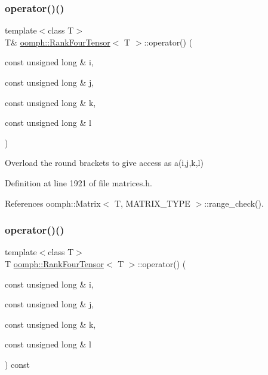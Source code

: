\mbox{\label{classoomph_1_1RankFourTensor_ab156bfb614c94c72d72452812d39897d}} 
\subsubsection{\texorpdfstring{operator()()}{operator()()}\hspace{0.1cm}{\footnotesize\ttfamily [1/2]}}
{\footnotesize\ttfamily template$<$class T$>$ \\
T\& \hyperlink{classoomph_1_1RankFourTensor}{oomph\+::\+Rank\+Four\+Tensor}$<$ T $>$\+::operator() (\begin{DoxyParamCaption}\item[{const unsigned long \&}]{i,  }\item[{const unsigned long \&}]{j,  }\item[{const unsigned long \&}]{k,  }\item[{const unsigned long \&}]{l }\end{DoxyParamCaption})\hspace{0.3cm}{\ttfamily [inline]}}



Overload the round brackets to give access as a(i,j,k,l) 



Definition at line 1921 of file matrices.\+h.



References oomph\+::\+Matrix$<$ T, M\+A\+T\+R\+I\+X\+\_\+\+T\+Y\+P\+E $>$\+::range\+\_\+check().

\mbox{\label{classoomph_1_1RankFourTensor_ab2319b2c0d1e48c6908b3a51c6105099}} 
\subsubsection{\texorpdfstring{operator()()}{operator()()}\hspace{0.1cm}{\footnotesize\ttfamily [2/2]}}
{\footnotesize\ttfamily template$<$class T$>$ \\
T \hyperlink{classoomph_1_1RankFourTensor}{oomph\+::\+Rank\+Four\+Tensor}$<$ T $>$\+::operator() (\begin{DoxyParamCaption}\item[{const unsigned long \&}]{i,  }\item[{const unsigned long \&}]{j,  }\item[{const unsigned long \&}]{k,  }\item[{const unsigned long \&}]{l }\end{DoxyParamCaption}) const\hspace{0.3cm}{\ttfamily [inline]}}



